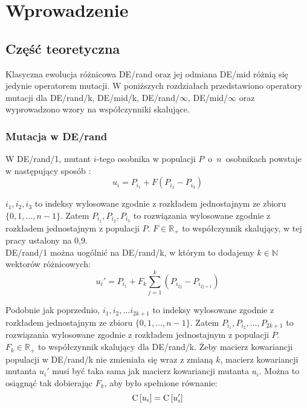 \chapter{Wprowadzenie}

\section{Część teoretyczna}

Klasyczna ewolucja różnicowa DE/rand oraz jej odmiana DE/mid różnią się jedynie operatorem mutacji.
W poniższych rozdziałach przedstawiono operatory mutacji dla DE/rand/k, DE/mid/k, DE/rand/$\infty$, DE/mid/$\infty$
oraz wyprowadzono wzory na współczynniki skalujące.

\subsection{Mutacja w DE/rand}

W DE/rand/1, mutant $i$-tego osobnika w populacji $P$~o~$n$~osobnikach powstaje w następujący sposób \cite{opara}:
\begin{equation} \label{eq:derand1}
u_i = P_{i_1} + F(P_{i_2} - P_{i_3})
\end{equation}

$i_1, i_2, i_3$ to indeksy wylosowane zgodnie z rozkładem jednostajnym ze zbioru \\ 
$\{0, 1, \dots, n-1\}$. Zatem $P_{i_1}, P_{i_2}, P_{i_3}$ to rozwiązania wylosowane zgodnie z rozkładem jednostajnym z populacji $P$.
$F\in\mathbb{R_+}$ to współczynnik skalujący, w tej pracy ustalony na 0,9. \\

DE/rand/1 można uogólnić na DE/rand/k, w którym to dodajemy
$k \in \mathbb{N}$ wektorów różnicowych:
\begin{equation} \label{eq:derand}
u_i' = P_{i_1} + F_k\sum\limits_{j=1}^k (P_{i_{2j}} - P_{i_{2j+1}})
\end{equation}

Podobnie jak poprzednio, $i_1, i_2, \dots i_{2k+1}$ to indeksy wylosowane zgodnie z rozkładem jednostajnym ze zbioru 
$\{0, 1, \dots, n-1\}$. Zatem $P_{i_1}, P_{i_2}, \dots, P_{2k+1}$ to rozwiązania wylosowane zgodnie z rozkładem 
jednostajnym z populacji $P$. $F_k\in\mathbb{R_+}$ to współczynnik skalujący dla DE/rand/k. 
Żeby macierz kowariancji populacji w DE/rand/k nie zmieniała się wraz z zmianą $k$, 
macierz kowariancji mutanta $u_i'$ musi być taka sama jak macierz kowariancji mutanta $u_i$.
Można to osiągnąć tak dobierając $F_k$, aby było spełnione równanie:
\begin{equation} \label{eq:kowariancje}
{\rm C}\,[u_i] = {\rm C}\,[u_i']
\end{equation}

